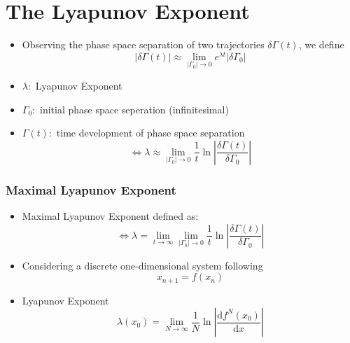 \documentclass[ignorenonframetext]{beamer}
\begin{document}
\section*{The Lyapunov Exponent}
\begin{frame}
\begin{itemize}
\frametitle{The Lyapunov Exponent}
\item Observing the phase space separation of two trajectories $\delta\Gamma(t)$, we define
\begin{equation}
\left|\delta\Gamma(t)\right|\approx \lim\limits_{\left|\Gamma_0\right| \rightarrow0} e^{\lambda t}\left|\delta\Gamma_0\right|
\end{equation}
\item $\lambda:$ Lyapunov Exponent
\item $\Gamma_0:$ initial phase space seperation (infinitesimal)
\item $\Gamma(t):$ time development of phase space separation 
\begin{equation}
\Leftrightarrow \lambda\approx \lim\limits_{\left|\Gamma_0\right| \rightarrow0} \frac{1}{t}\ln\left|\frac{\delta\Gamma(t)}{\delta\Gamma_0}\right|
\end{equation}
\end{itemize}
\end{frame}

\begin{frame}
\frametitle{Maximal Lyapunov Exponent}
\begin{itemize}
\item Maximal Lyapunov Exponent defined as:
\begin{equation}
\Leftrightarrow \lambda = \lim\limits_{t \rightarrow \infty} \lim\limits_{\left|\Gamma_0\right| \rightarrow0}  \frac{1}{t}\ln\left|\frac{\delta\Gamma(t)}{\delta\Gamma_0}\right|
\end{equation}
\item Considering a discrete one-dimensional system following
\begin{equation}
x_{n+1}=f(x_n)
\end{equation}
\item Lyapunov Exponent
\begin{equation}
\lambda(x_0)=\lim\limits_{N\rightarrow\infty} \frac{1}{N} \ln\left|\frac{\mathrm{d}f^N(x_0)}{\mathrm{d}x}\right|
\end{equation}
\end{itemize}
\end{frame}
\end{document}
